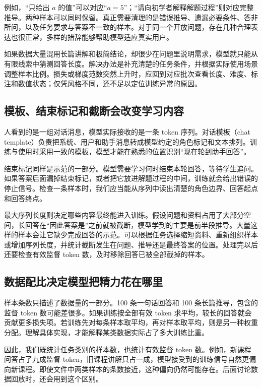 例如，“只给出 $a$ 的值”可以对应“$a=5$”；“请向初学者解释解题过程”则对应完整推导。两种样本可以同时保留。真正需要清理的是错误推导、遗漏必要条件、答非所问，以及任务要求与答案不一致的样本。对于同一个开放问题，存在几种合理表达也很正常，多样的措辞能够帮助模型适应真实用户。

如果数据大量混用长篇讲解和极简结论，却很少在问题里说明需求，模型就只能从有限线索中猜测回答长度。解决办法是补充清楚的任务条件，并根据实际使用场景调整样本比例。损失或梯度范数突然上升时，应回到对应批次查看长度、难度、标注和数值状态；仅凭风格不同，还不足以定位训练异常的原因。

\subsection{模板、结束标记和截断会改变学习内容}

人看到的是一组对话消息，模型实际接收的是一条 token 序列。对话模板（chat template）负责把系统、用户和助手消息转成模型约定的角色标记和文本排列。训练与使用时采用一致的模板，模型才能在熟悉的位置识别“现在轮到助手回答”。

结束标记同样是示范的一部分。模型需要学习何时结束本轮回答，等待学生追问。如果答案后面漏掉结束标记，或者把它放进解题过程的中间，训练就会给出错误的停止信号。检查一条样本时，我们应当能从序列中读出清楚的角色边界、回答起点和回答终点。

最大序列长度则决定哪些内容最终能进入训练。假设问题和资料占用了大部分空间，长回答在“因此答案是”之前就被截断，模型学到的主要是前半段推导。大量这样的样本会让它缺少完成回答的示范。可以根据任务选择缩短资料、重新组织样本或增加序列长度，并统计截断发生在问题、推导还是最终答案的位置。处理完以后还要检查有效监督 token 数，及时移除回答已被全部截掉的样本。

\subsection{数据配比决定模型把精力花在哪里}

样本条数只描述了数据量的一部分。100 条一句话回答和 100 条长篇推导，包含的监督 token 数可能差很多。如果训练按全部有效 token 求平均，较长的回答就会贡献更多损失项。若训练先对每条样本取平均，再对样本取平均，则是另一种权重分配。理解具体实现，才能解释某类数据实际占了多大训练比重。

因此，我们既统计任务类别的样本数，也统计有效监督 token 数。例如，新课程问答占了九成监督 token，旧课程讲解只占一成，模型接受到的训练信号自然更偏向新课程。即使文件中两类样本的条数接近，这种偏向仍然可能存在。后面讨论数据回放时，还会用到这个区别。

